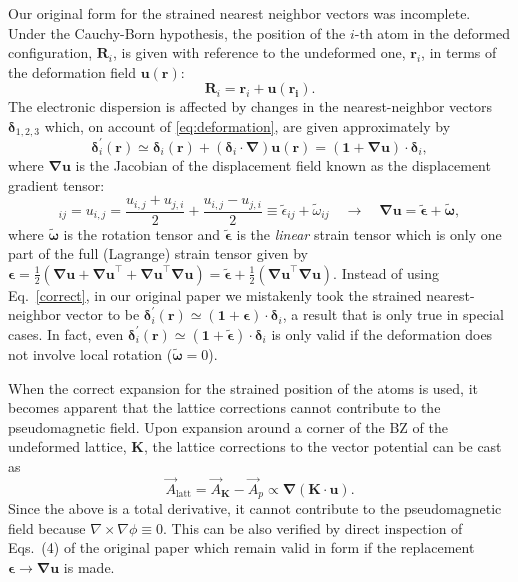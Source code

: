 Our original form for the strained nearest neighbor vectors was incomplete. Under the Cauchy-Born hypothesis, the position of the $i$-th atom in the deformed configuration, $\bm{R}_i$, is given with reference to the undeformed one, $\bm{r}_i$, in terms of the deformation field $\bm{u}(\bm{r})$:
%
\begin{equation}
  \bm{R}_{i}=\bm{r}_{i}+\bm{u}(\bm{r_i})
  \label{eq:deformation}.
\end{equation}
%
The electronic dispersion is affected by changes in the nearest-neighbor vectors $\bm{\delta}_{1,2,3}$ which, on account of \eqref{eq:deformation}, are given approximately by
%
\begin{equation}
\bm{\delta}_{i}^{\prime}(\bm{r})\simeq\bm{\delta}_{i}(\bm{r}
)+\left(\bm{\delta }_{i} \cdot\bm{\nabla}\right)\bm{u}(\bm{r})
= (\bm{1}+\bm{\nabla u})\cdot\bm{\delta }_{i}
\label{correct}
  ,
\end{equation}
%
where $\bm{\nabla}\bm{u}$ is the Jacobian of the displacement field known as the displacement gradient tensor:
%
\begin{equation*}
  [\bm{\nabla u}]_{ij} = u_{i,j}
  = \frac{u_{i,j}+u_{j,i}}{2} + \frac{u_{i,j}-u_{j,i}}{2}
  \equiv \tilde{\epsilon}_{ij} + \tilde{\omega}_{ij}
  \quad\longrightarrow\quad \bm{\nabla u} = \tilde{\bm{\epsilon}} +
\tilde{\bm{\omega}}
  ,
\end{equation*}
%
where $\tilde{\bm{\omega}}$ is the rotation tensor and $\tilde{\bm{\epsilon}}$ is the \emph{linear} strain tensor which is only one part of the full (Lagrange) strain tensor given by $\bm{\epsilon} = \tfrac{1}{2}(\bm{\nabla u} + \bm{\nabla u}^\top+\bm{\nabla u}^\top\bm{\nabla u}) = \tilde{\bm{\epsilon}} + \tfrac{1}{2}(\bm{\nabla u}^\top\bm{\nabla u})$.  Instead of using Eq.~\eqref{correct}, in our original paper we mistakenly took the strained nearest-neighbor vector to be $\bm{\delta}_{i}^{\prime}(\bm{r})\simeq (\bm{1}+\bm{\epsilon})\cdot\bm{\delta }_{i}$, a result that is only true in special cases.  In fact, even $\bm{\delta}_{i}^{\prime}(\bm{r})\simeq (\bm{1}+\tilde{\bm{\epsilon}})\cdot\bm{\delta }_{i}$ is only valid if the deformation does not involve local rotation ($\tilde{\bm{\omega}}=0$).


When the correct expansion for the strained position of the atoms is used, it becomes apparent that the lattice corrections cannot contribute to the pseudomagnetic field. Upon expansion around a corner of the BZ of the undeformed lattice, $\bm{K}$, the lattice corrections to the vector potential can be cast as \cite{deJuan:2012}
%
\begin{equation}
  \vec{A}_\text{latt}=\vec{A}_{\bm{K}}-\vec{A}_p \propto \bm{\nabla} (\bm{K}\cdot\bm{u})
  .
\end{equation}
%
Since the above is a total derivative, it cannot contribute to the pseudomagnetic field because $\nabla\times\nabla \phi \equiv 0$. This can be also verified by direct inspection of Eqs.~(4) of the original paper which remain valid in form if the replacement $\bm{\epsilon } \to \bm{ \nabla u }$ is made.


